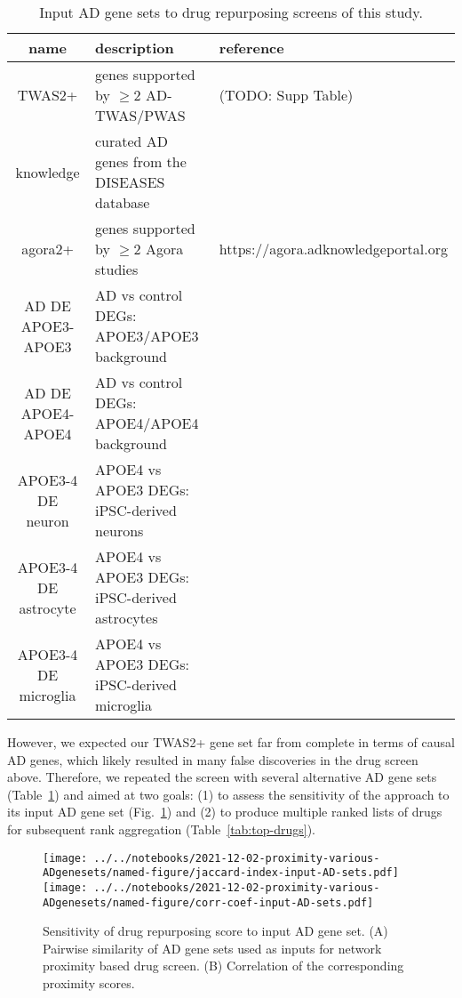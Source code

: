 \documentclass[letterpaper]{article}
\begin{document}
\begin{table}
\footnotesize
\begin{tabular}{cll}
name     & description & reference  \\
\hline
TWAS2+   & genes supported by $\ge 2$ AD-TWAS/PWAS & (TODO: Supp Table)  \\
knowledge& curated AD genes from the DISEASES database & \cite{PletscherFrankild2015} \\
agora2+  & genes supported by $\ge 2$ Agora studies & https://agora.adknowledgeportal.org \\
AD DE APOE3-APOE3 & AD vs control DEGs: APOE3/APOE3 background & \cite{Taubes2021} \\
AD DE APOE4-APOE4 & AD vs control DEGs: APOE4/APOE4 background & \cite{Taubes2021} \\
APOE3-4 DE neuron & APOE4 vs APOE3 DEGs: iPSC-derived neurons& \cite{Lin2018} \\
APOE3-4 DE astrocyte & APOE4 vs APOE3 DEGs: iPSC-derived astrocytes& \cite{Lin2018} \\
APOE3-4 DE microglia & APOE4 vs APOE3 DEGs: iPSC-derived microglia& \cite{Lin2018} \\
\end{tabular}
\caption{
Input AD gene sets to drug repurposing screens of this study.
}
\label{tab:genesets}
\end{table}

However, we expected our TWAS2+ gene set far from complete in terms of
causal AD genes, which likely resulted in many false discoveries in the
drug screen above.  Therefore, we repeated the screen with several alternative AD gene
sets (Table~\ref{tab:genesets}) and aimed at two goals: (1) to assess the
sensitivity of the approach to its input AD gene set
(Fig.~\ref{fig:divergent-results}) and (2) to produce multiple ranked lists of
drugs for subsequent rank aggregation (Table~\ref{tab:top-drugs}).

\begin{figure}
\texttt{[image: ../../notebooks/2021-12-02-proximity-various-ADgenesets/named-figure/jaccard-index-input-AD-sets.pdf]}
\texttt{[image: ../../notebooks/2021-12-02-proximity-various-ADgenesets/named-figure/corr-coef-input-AD-sets.pdf]}
\caption{
  Sensitivity of drug repurposing score to input AD gene set. (A) Pairwise
  similarity of AD gene sets used as inputs for network proximity based drug
  screen.  (B) Correlation of the corresponding proximity scores.
}
\label{fig:divergent-results}
\end{figure}
\end{document}
